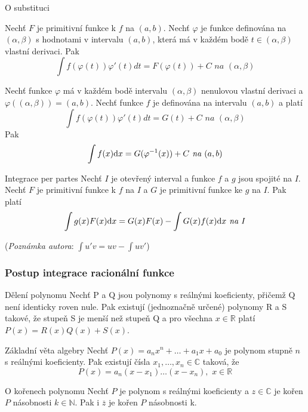 \begin{vetaN}{O substituci}
\begin{penumerate}
\item Nechť $F$ je primitivní funkce k $f$ na $(a,b)$. Nechť $\varphi$ je funkce definována na $(\alpha, \beta)$ s hodnotami v intervalu $(a,b)$, která má v každém bodě $t \in (\alpha, \beta)$ vlastní derivaci. Pak
$$\int f(\varphi(t))\varphi'(t)dt=F(\varphi(t))+C \textit{ na } (\alpha,\beta)$$
\item Nechť funkce $\varphi$ má v každém bodě intervalu $(\alpha,\beta)$ nenulovou vlastní derivaci a $\varphi((\alpha,\beta)) = (a,b)$. Nechť funkce $f$ je definována na intervalu $(a,b)$ a platí
$$\int f(\varphi(t))\varphi'(t)dt=G(t)+C \textit{ na } (\alpha,\beta)$$
Pak
$$\int f(x)\mathrm{d} x=G(\varphi^{-1}(x))+C \textit{ na } (a,b)$$
\end{penumerate}
\end{vetaN}

\begin{vetaN}{Integrace per partes}
Nechť $I$ je otevřený interval a funkce $f$ a $g$ jsou spojité na $I$. Nechť $F$ je primitivní funkce k $f$ na $I$ a $G$ je primitivní funkce ke $g$ na $I$. Pak platí
$$\int g(x)F(x)\mathrm{d} x=G(x)F(x) - \int G(x)f(x)\mathrm{d} x \textit{ na } I$$

(\emph{Poznámka autora}: $\int u'v = uv - \int uv'$)
\end{vetaN}

\subsubsection{Postup integrace racionální funkce}

\begin{vetaN}{Dělení polynomu}
Nechť P a Q jsou polynomy s reálnými koeficienty, přičemž Q není identicky roven nule. Pak existují (jednoznačně určené) polynomy R a S takové, že stupeň S je menší než stupeň Q a pro všechna $x \in \mathbb{R}$ platí $P(x)=R(x)Q(x)+S(x)$.
\end{vetaN}

\begin{vetaN}{Základní věta algebry}
Nechť $P(x)=a_nx^n+\dots+a_1x+a_0$ je polynom stupně $n$ s reálnými koeficienty. Pak existují čísla $x_1,\dots,x_n \in \mathbb{C}$ taková, že
$$P(x)=a_n(x-x_1)\dots(x-x_n), \,\, x \in \mathbb{R}$$
\end{vetaN}

\begin{vetaN}{O kořenech polynomu}
Nechť $P$ je polynom s reálnými koeficienty a $z \in \mathbb{C}$ je kořen $P$ násobnosti $k \in \mathbb{N}$. Pak i $\overline{z}$ je kořen $P$ násobnosti k.
\end{vetaN}

